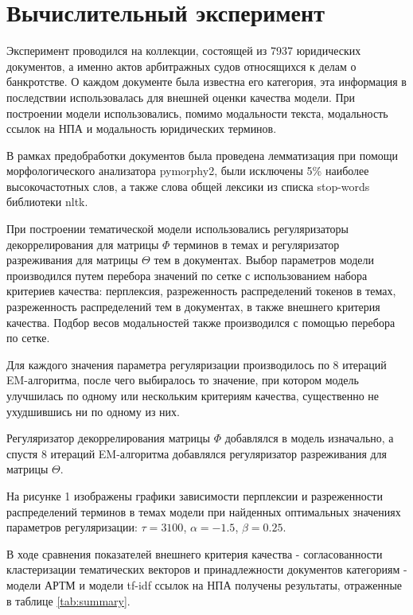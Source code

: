 \documentclass[12pt]{article}
\begin{document}
\section{Вычислительный эксперимент}
Эксперимент проводился на коллекции, состоящей из 7937 юридических документов, а именно актов арбитражных судов относящихся к делам о банкротстве. О каждом документе была известна его категория, 
эта информация в последствии использовалась для внешней оценки качества модели. При построении модели использовались, помимо модальности текста, модальность ссылок на НПА и модальность юридических терминов. 

В рамках предобработки документов была проведена лемматизация при помощи морфологического анализатора pymorphy2, были исключены 5\% наиболее высокочастотных слов, а также слова общей лексики из списка stop-words библиотеки nltk.

При построении тематической модели использовались регуляризаторы декоррелирования для матрицы $\Phi$ терминов в темах и регуляризатор разреживания для матрицы $\Theta$ тем в документах. Выбор параметров модели производился путем перебора значений по сетке с использованием набора критериев качества: перплексия, разреженность распределений токенов в темах, разреженность распределений тем в документах, в также внешнего критерия качества. Подбор весов модальностей также производился с помощью перебора по сетке.

Для каждого значения параметра регуляризации производилось по 8 итераций EM-алгоритма, после чего выбиралось то значение, при котором модель улучшилась по одному или нескольким критериям качества, существенно не ухудшившись ни по одному из них. 

Регуляризатор декоррелирования матрицы $\Phi$ добавлялся в модель изначально, а спустя 8 итераций EM-алгоритма добавлялся регуляризатор разреживания для матрицы $\Theta$. 

На рисунке 1 изображены графики зависимости перплексии и разреженности распределений терминов в темах модели при найденных оптимальных значениях параметров регуляризации: $\tau = 3100$, $\alpha = -1.5$, $\beta = 0.25$.

В ходе сравнения показателей внешнего критерия качества - согласованности кластеризации тематических векторов и принадлежности документов категориям - модели АРТМ и модели tf-idf ссылок на НПА получены результаты, отраженные в таблице \ref{tab:summary}.
\end{document}
